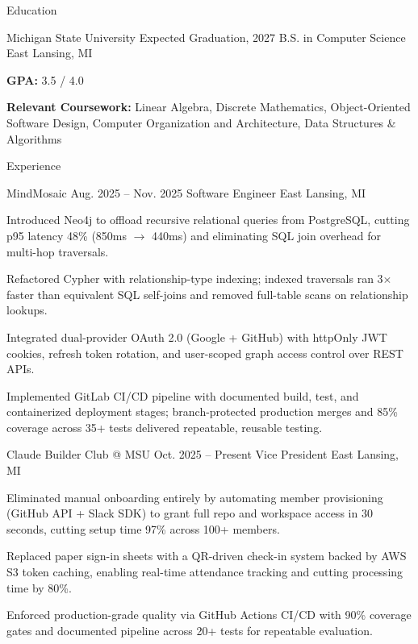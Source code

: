 \documentclass[
	11pt
]{../../../resume}
\begin{document}
	\begin{rSection}{E}{ducation}
		\begin{rSectionEntry}
			{Michigan State University}
			{Expected Graduation, 2027}
			{B.S. in Computer Science}
			{}
			{East Lansing, MI}

			\item \textbf{GPA:} 3.5 / 4.0
			\item \textbf{Relevant Coursework:} Linear Algebra, Discrete Mathematics, Object-Oriented Software Design, Computer Organization and Architecture, Data Structures \& Algorithms
		\end{rSectionEntry}
	\end{rSection}

	\begin{rSection}{E}{xperience}
		\begin{rSectionEntry}
			{MindMosaic}
			{Aug. 2025 -- Nov. 2025}
			{Software Engineer}
			{}
			{East Lansing, MI}

			\item Introduced Neo4j to offload recursive relational queries from PostgreSQL, cutting p95 latency 48\% (850ms $\rightarrow$ 440ms) and eliminating SQL join overhead for multi-hop traversals.
			\item Refactored Cypher with relationship-type indexing; indexed traversals ran 3$\times$ faster than equivalent SQL self-joins and removed full-table scans on relationship lookups.
			\item Integrated dual-provider OAuth 2.0 (Google + GitHub) with httpOnly JWT cookies, refresh token rotation, and user-scoped graph access control over REST APIs.
			\item Implemented GitLab CI/CD pipeline with documented build, test, and containerized deployment stages; branch-protected production merges and 85\% coverage across 35+ tests delivered repeatable, reusable testing.
		\end{rSectionEntry}

		\begin{rSectionEntry}
			{Claude Builder Club @ MSU}
			{Oct. 2025 -- Present}
			{Vice President}
			{}
			{East Lansing, MI}

			\item Eliminated manual onboarding entirely by automating member provisioning (GitHub API + Slack SDK) to grant full repo and workspace access in 30 seconds, cutting setup time 97\% across 100+ members.
			\item Replaced paper sign-in sheets with a QR-driven check-in system backed by AWS S3 token caching, enabling real-time attendance tracking and cutting processing time by 80\%.
			\item Enforced production-grade quality via GitHub Actions CI/CD with 90\% coverage gates and documented pipeline across 20+ tests for repeatable evaluation.
		\end{rSectionEntry}
	\end{rSection}
\end{document}
